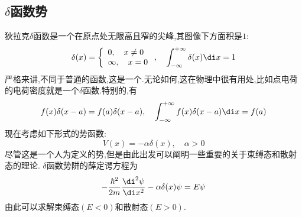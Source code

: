 \documentclass{ctexart}
\begin{document}
\subsection{$\delta$函数势}
狄拉克$\delta$函数是一个在原点处无限高且窄的尖峰,其图像下方面积是$1$:
\[\delta(x)=\left\{\begin{array}{l}
    0,\quad x\neq0\\
    \infty,\quad x=0
\end{array}\right.,\quad\int_{-\infty}^{+\infty}\delta(x)\di x=1\]
严格来讲,不同于普通的函数,这是一个.无论如何,这在物理中很有用处,比如点电荷的电荷密度就是一个$\delta$函数.特别的,有
\[f(x)\delta(x-a)=f(a)\delta(x-a),\quad \int_{-\infty}^{+\infty}f(x)\delta(x-a)\di x=f(a)\]
\indent 现在考虑如下形式的势函数:
\[V(x)=-\alpha\delta(x),\quad\alpha>0\]
尽管这是一个人为定义的势,但是由此出发可以阐明一些重要的关于束缚态和散射态的理论. $\delta$函数势阱的薛定谔方程为
\[-\dfrac{\hbar^2}{2m}\dfrac{\di^2\psi}{\di x^2}-\alpha\delta(x)\psi=E\psi\]
由此可以求解束缚态$(E<0)$和散射态$(E>0)$.
\end{document}
